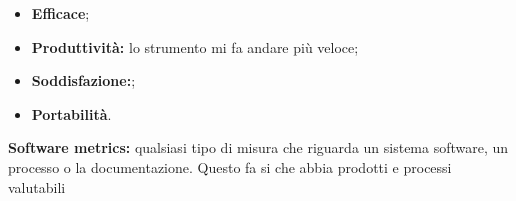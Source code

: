 \begin{itemize}

	\item \textbf{Efficace};
	\item \textbf{Produttività:} lo strumento mi fa andare più veloce;
	\item \textbf{Soddisfazione:};
	\item \textbf{Portabilità}.
	
\end{itemize}

\textbf{Software metrics:} qualsiasi tipo di misura che riguarda un sistema software, un processo o la documentazione. Questo fa si che abbia prodotti e processi valutabili


